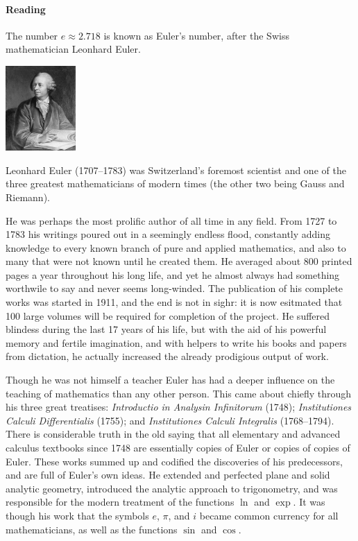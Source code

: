 \paragraph{Reading}
The number $ e \approx 2.718 $ is known as Euler's number, after the Swiss mathematician Leonhard Euler.

\begin{center}
  \includegraphics[width=0.2\textwidth]{euler}
\end{center}

Leonhard Euler (1707--1783) was Switzerland's foremost scientist and one of the three greatest mathematicians of modern times (the other two being
Gauss and Riemann).

He was perhaps the most prolific author of all time in any field. From 1727 to 1783 his writings poured out in a seemingly endless flood, constantly
adding knowledge to every known branch of pure and applied mathematics, and also to many that were not known until he created them. He averaged about
800 printed pages a year throughout his long life, and yet he almost always had something worthwile to say and never seems long-winded. The publication
of his complete works was started in 1911, and the end is not in sighr: it is now esitmated that 100 large volumes will be required for completion
of the project. He suffered blindess during the last 17 years of his life, but with the aid of his powerful memory and fertile imagination, and with
helpers to write his books and papers from dictation, he actually increased the already prodigious output of work.

Though he was not himself a teacher Euler has had a deeper influence on the teaching of mathematics than any other person. This came about chiefly
through his three great treatises: \emph{Introductio in Analysin Infinitorum} (1748); \emph{Institutiones Calculi Differentialis} (1755);
and \emph{Institutiones Calculi Integralis} (1768--1794). There is considerable truth in the old saying that all elementary and advanced calculus
textbooks since 1748 are essentially copies of Euler or copies of copies of Euler. These works summed up and codified the discoveries of his
predecessors, and are full of Euler's own ideas. He extended and perfected plane and solid analytic geometry, introduced the analytic approach
to trigonometry, and was responsible for the modern treatment of the functions $ \ln $ and $ \exp $. It was though his work that the symbols $ e $,
$ \pi $, and $ i $ became common currency for all mathematicians, as well as the functions $ \sin $ and $ \cos $.

